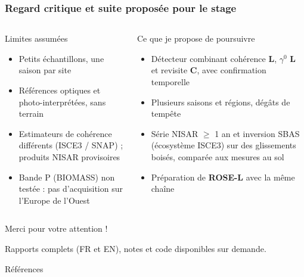 \documentclass[aspectratio=169]{beamer}
\newcommand{\Lb}[1]{\textcolor{Lband}{\textbf{#1}}}
\newcommand{\Cb}[1]{\textcolor{Cband}{\textbf{#1}}}
\begin{document}
\begin{frame}{\phantom{x}}
	\frametitle{Regard critique et suite proposée pour le stage}
	\vspace{-6pt}\scriptsize
	\begin{columns}[T]
		\begin{alertblock}{Limites assumées}
			\scriptsize
			\begin{itemize}
				\setlength{\itemsep}{1pt}
				\item Petits échantillons, une saison par site
				\item Références optiques et photo-interprétées, sans terrain
				\item Estimateurs de cohérence différents (ISCE3 / SNAP) ; produits NISAR provisoires
				\item Bande P (BIOMASS) non testée : pas d'acquisition sur l'Europe de l'Ouest
			\end{itemize}
		\end{alertblock}
		\begin{block}{Ce que je propose de poursuivre}
			\scriptsize
			\begin{itemize}
				\setlength{\itemsep}{1pt}
				\item Détecteur combinant cohérence \Lb{L}, $\gamma^0$ \Lb{L} et revisite \Cb{C}, avec confirmation
				temporelle
				\item Plusieurs saisons et régions, dégâts de tempête
				\item Série NISAR $\geq$ 1 an et inversion SBAS (écosystème ISCE3) sur des glissements boisés,
				comparée aux mesures au sol
				\item Préparation de \textbf{ROSE-L} avec la même chaîne
			\end{itemize}
		\end{block}
	\end{columns}
\end{frame}

\begin{frame}
	\vfill
	\centering
	{\Large Merci pour votre attention !}

	\vspace{1em}
	\small\textcolor{mydgray}{Rapports complets (FR et EN), notes et code disponibles sur demande.}
	\vfill
\end{frame}

\begin{frame}[allowframebreaks]{Références}
	\scriptsize
	\nocite{torres2012sentinel1,snap,ose2015guide,drusch2012sentinel2}
	\printbibliography[heading=none]
\end{frame}
\end{document}
